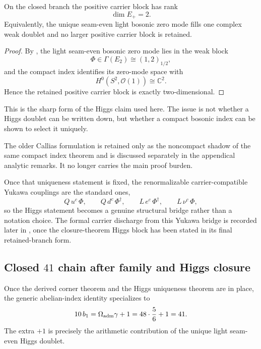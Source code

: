 \begin{corollary}
\label{cor:bosonic-rank-two}
On the closed branch the positive carrier block has rank
\[
\dim E_+=2.
\]
Equivalently, the unique seam-even light bosonic zero mode fills one complex weak doublet and no
larger positive carrier block is retained.
\end{corollary}

\begin{proof}
By , the light seam-even bosonic zero mode lies in the weak block
\[
\Phi\in\Gamma(E_2)\cong (1,2)_{1/2},
\]
and the compact index identifies its zero-mode space with
\[
H^0(S^2,\mathcal O(1))\cong\mathbb C^2.
\]
Hence the retained positive carrier block is exactly two-dimensional.
\end{proof}

This is the sharp form of the Higgs claim used here. The issue is not whether a Higgs doublet can
be written down, but whether a compact bosonic index can be shown to select it uniquely.
\begin{remark}
The older Callias formulation is retained only as the noncompact shadow of the same compact index
theorem and is discussed separately in the appendical analytic remarks. It no longer carries the
main proof burden.
\end{remark}

Once that uniqueness statement is fixed, the renormalizable carrier-compatible Yukawa couplings
are the standard ones,
\[
Q\,u^c\,\Phi,
\qquad
Q\,d^c\,\Phi^\dagger,
\qquad
L\,e^c\,\Phi^\dagger,
\qquad
L\,\nu^c\,\Phi,
\]
so the Higgs statement becomes a genuine structural bridge rather than a notation choice. The
formal carrier discharge from this Yukawa bridge is recorded later in
, once the closure-theorem Higgs block has
been stated in its final retained-branch form.

\subsection{Closed \texorpdfstring{$41$}{41} chain after family and Higgs closure}

Once the derived corner theorem and the Higgs uniqueness theorem are in place, the generic
abelian-index identity  specializes to
\begin{equation}
\label{eq:41-chain-specialized}
10\,b_1
=
\Omega_{\mathrm{adm}}\gamma+1
=
48\cdot\frac56+1
=
41.
\end{equation}
The extra $+1$ is precisely the arithmetic contribution of the unique light seam-even Higgs
doublet.


